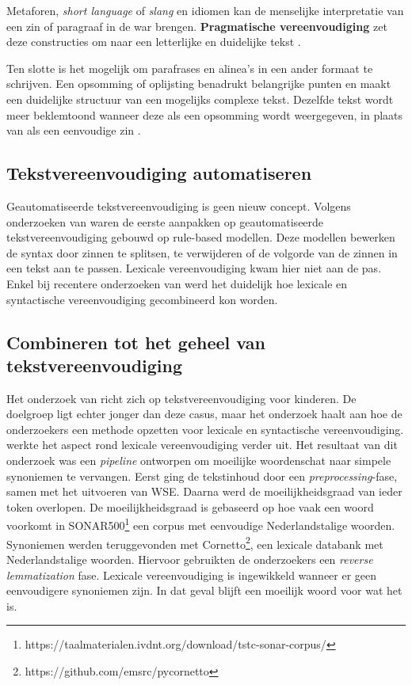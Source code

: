 Metaforen, \textit{short language} of \textit{slang} en idiomen kan de menselijke interpretatie van een zin of paragraaf in de war brengen. \textbf{Pragmatische vereenvoudiging} zet deze constructies om naar een letterlijke en duidelijke tekst \autocite{JavoureyDrevet2022}.

Ten slotte is het mogelijk om parafrases en alinea's in een ander formaat te schrijven. Een opsomming of oplijsting benadrukt belangrijke punten en maakt een duidelijke structuur van een mogelijks complexe tekst. Dezelfde tekst wordt meer beklemtoond wanneer deze als een opsomming wordt weergegeven, in plaats van als een eenvoudige zin \autocite{Siddharthan2014, Hale2022}. 

\subsection{Tekstvereenvoudiging automatiseren}

Geautomatiseerde tekstvereenvoudiging is geen nieuw concept. Volgens onderzoeken van \textcite{Canning2000, Siddharthan2006} waren de eerste aanpakken op geautomatiseerde tekstvereenvoudiging gebouwd op rule-based modellen. Deze modellen bewerken de syntax door zinnen te splitsen, te verwijderen of de volgorde van de zinnen in een tekst aan te passen. Lexicale vereenvoudiging kwam hier niet aan de pas. Enkel bij recentere onderzoeken van \textcite{Coster2011, Bulte2018} werd het duidelijk hoe lexicale en syntactische vereenvoudiging gecombineerd kon worden.

\subsection{Combineren tot het geheel van tekstvereenvoudiging}

Het onderzoek van \textcite{DeBelder2010} richt zich op tekstvereenvoudiging voor kinderen. De doelgroep ligt echter jonger dan deze casus, maar het onderzoek haalt aan hoe de onderzoekers een methode opzetten voor lexicale en syntactische vereenvoudiging. \textcite{Bulte2018} werkte het aspect rond lexicale vereenvoudiging verder uit. Het resultaat van dit onderzoek was een \textit{pipeline} ontworpen om moeilijke woordenschat naar simpele synoniemen te vervangen. Eerst ging de tekstinhoud door een \textit{preprocessing}-fase, samen met het uitvoeren van WSE. Daarna werd de moeilijkheidsgraad van ieder token overlopen. De moeilijkheidsgraad is gebaseerd op hoe vaak een woord voorkomt in SONAR500\footnote{https://taalmaterialen.ivdnt.org/download/tstc-sonar-corpus/} een corpus met eenvoudige Nederlandstalige woorden. Synoniemen werden teruggevonden met Cornetto\footnote{https://github.com/emsrc/pycornetto}, een lexicale databank met Nederlandstalige woorden. Hiervoor gebruikten de onderzoekers een \textit{reverse lemmatization} fase. Lexicale vereenvoudiging is ingewikkeld wanneer er geen eenvoudigere synoniemen zijn. In dat geval blijft een moeilijk woord voor wat het is.

